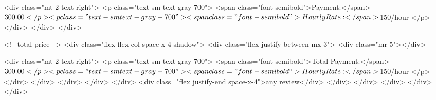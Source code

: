                   <div class="mt-2 text-right">
                    <p class="text-sm text-gray-700">
                      <span class="font-semibold">Payment:</span> $300.00
                    </p>
                    <p class="text-sm text-gray-700">
                      <span class="font-semibold">Hourly Rate:</span> $150/hour
                    </p>
                  </div>
                </div>
              </div>

              <!-- total price -->
              <div class="flex flex-col space-x-4 shadow">
                <div class="flex justify-between mx-3">
                  <div class="mr-5"></div>

                  <div class="mt-2 text-right">
                    <p class="text-sm text-gray-700">
                      <span class="font-semibold">Total Payment:</span> $300.00
                    </p>
                    <p class="text-sm text-gray-700">
                      <span class="font-semibold">Hourly Rate:</span> $150/hour
                    </p>
                  </div>
                </div>
              </div>
            </div>
          </div>
          <div class="flex justify-end space-x-4">any review</div>
        </div>
      </div>
    </div>
  </div>
</div>

